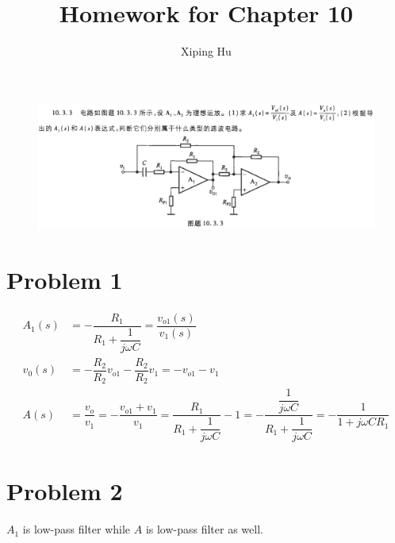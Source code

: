 \documentclass{article}
\author{Xiping Hu}
\affil{https://hxp.plus/}
\title{Homework for Chapter 10}
\begin{document}
\maketitle

\begin{figure}[H]
  \centering
  \includegraphics[width=\linewidth]{figures/Problem1033}
\end{figure}

\section{Problem 1}

\begin{equation*}
  \begin{aligned}
    A_1 \left( s \right) &= - \dfrac{R_1}{R_1 + \dfrac{1}{j \omega C} } = \dfrac{v_{o1} \left( s \right)}{v_1 \left( s \right)}  \\
    v_0 \left( s \right) &= - \dfrac{R_2}{R_2} v_{o1} - \dfrac{R_2}{R_2} v_1 = - v_{o1} - v_1 \\
    A \left( s \right) &= \dfrac{v_o}{v_1} = - \dfrac{v_{o1} + v_1}{v_1} = \dfrac{R_1}{R_1 + \dfrac{1}{j \omega C} } - 1 = - \dfrac{\dfrac{1}{j \omega C} }{R_1 + \dfrac{1}{j \omega C} }  = - \dfrac{1}{1 + j \omega C R_1} 
  \end{aligned}
\end{equation*}

\section{Problem 2}

$A_1$ is low-pass filter while $A$ is low-pass filter as well.
\end{document}
